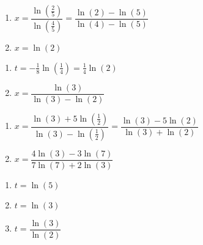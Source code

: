 \begin{multicols}{2}
\begin{enumerate}
\setcounter{enumi}{\value{HW}}

\item $x = \dfrac{\ln\left(\frac{2}{5}\right)}{\ln\left(\frac{4}{5}\right)} = \dfrac{\ln(2)-\ln(5)}{\ln(4) - \ln(5)}$

\item $x =  \ln(2)$ 


\setcounter{HW}{\value{enumi}}
\end{enumerate}
\end{multicols}

\begin{multicols}{2}
\begin{enumerate}
\setcounter{enumi}{\value{HW}}


\item  $t = -\frac{1}{8} \ln\left(\frac{1}{4} \right) = \frac{1}{4}\ln(2)$ 

\item $x = \dfrac{\ln(3)}{\ln(3) - \ln(2)}$

\setcounter{HW}{\value{enumi}}
\end{enumerate}
\end{multicols}

\begin{multicols}{2}
\begin{enumerate}
\setcounter{enumi}{\value{HW}}


\item $x = \dfrac{\ln(3) + 5\ln\left(\frac{1}{2}\right)}{\ln(3) - \ln\left(\frac{1}{2}\right)} = \dfrac{\ln(3)-5\ln(2)}{\ln(3)+\ln(2)}$
\item  $x = \dfrac{4 \ln(3) - 3 \ln(7)}{7 \ln(7) + 2 \ln(3)}$ 

\setcounter{HW}{\value{enumi}}
\end{enumerate}
\end{multicols}

\begin{multicols}{3}
\begin{enumerate}
\setcounter{enumi}{\value{HW}}

\item $t=\ln(5)$ 
\item $t=\ln(3)$  
\item $t=\dfrac{\ln(3)}{\ln(2)}$


\setcounter{HW}{\value{enumi}}
\end{enumerate}
\end{multicols}

